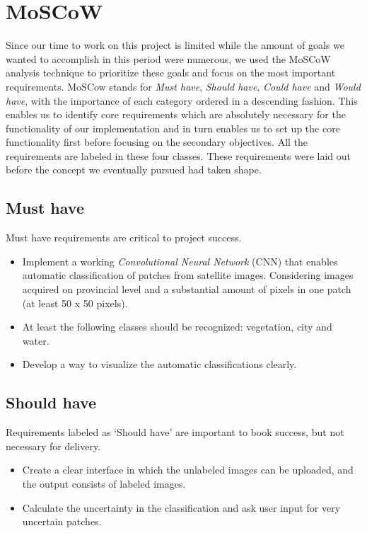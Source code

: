 \documentclass[a4paper,onecolumn]{report}
\begin{document}
\section{MoSCoW}
Since our time to work on this project is limited while the amount of goals we wanted to accomplish in this period were numerous, we used the MoSCoW analysis technique to prioritize these goals and focus on the most important requirements. MoSCow stands for \textit{Must have}, \textit{Should have}, \textit{Could have} and \textit{Would have}, with the importance of each category ordered in a descending fashion. This enables us to identify core requirements which are absolutely necessary for the functionality of our implementation and in turn enables us to set up the core functionality first before focusing on the secondary objectives. All the requirements are labeled in these four classes. These requirements were laid out before the concept we eventually pursued had taken shape.\\

\subsection{Must have}
Must have requirements are critical to project success. 
\begin{itemize}
\item Implement a working \textit{Convolutional Neural Network} (CNN) that enables automatic classification of patches from satellite images. Considering images acquired on provincial level and a substantial amount of pixels in one patch (at least 50 x 50 pixels). 
\item At least the following classes should be recognized: vegetation, city and water. 
\item Develop a way to visualize the automatic classifications clearly.
\end{itemize}

\subsection{Should have}
Requirements labeled as `Should have' are important to book success, but not necessary for delivery.

\begin{itemize}
\item Create a clear interface in which the unlabeled images can be uploaded, and the output consists of labeled images. 
\item Calculate the uncertainty in the classification and ask user input for very uncertain patches.
\end{itemize}
\end{document}
